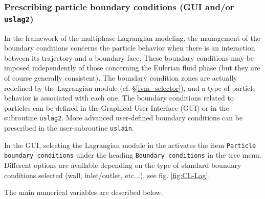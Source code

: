 {{{%
\subsubsection{Prescribing particle boundary conditions (GUI and/or \texttt{uslag2})}
In the framework of the multiphase Lagrangian modeling, the management of the boundary conditions concerns the particle behavior when there is an interaction between its trajectory and a boundary face. These boundary conditions may be imposed independently of those concerning the Eulerian fluid phase (but they are of course generally consistent). The boundary condition zones are actually redefined by the Lagrangian module (cf. \S\ref{fvm_selector}), and a type of particle behavior is associated with each one. The boundary conditions related to particles can be defined in the Graphical User Interface (GUI) or in the subroutine \texttt{uslag2}. More advanced user-defined boundary conditions can be prescribed in the user-subroutine \texttt{uslain}.


 In the GUI, selecting the Lagrangian module in the activates the item \texttt{Particle boundary conditions} under the heading \texttt{Boundary conditions} in the tree menu. Different options are available depending on the type of standard boundary conditions selected (wall, inlet/outlet, etc...), see fig. \ref{fig:CL-Lag}.



The main numerical variables are described below.


}}}
